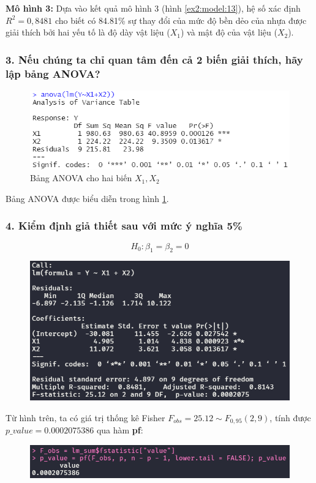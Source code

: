 \documentclass[a4paper]{article}
\theoremstyle{nonumberplain}
\begin{document}
\textbf{Mô hình 3:} Dựa vào kết quả mô hình 3 (hình \ref{ex2:model:13}), hệ số xác định $R^2= 0,8481$ cho biết có 84.81\% sự thay đổi của mức độ bền dẻo của nhựa được giải thích bởi hai yếu tố là độ dày vật liệu ($X_1$) và mật độ của vật liệu ($X_2$).

\subsubsection*{3. Nếu chúng ta chỉ quan tâm đến cả 2 biến giải thích, hãy lập bảng ANOVA?}

\begin{figure}[h!]
	\centering
	\includegraphics[width=0.7\linewidth]{bai2_3.PNG}
	\caption{Bảng ANOVA cho hai biến $X_1,X_2$}
	\label{ex2:model:anova3}
\end{figure}

Bảng ANOVA được biểu diễn trong hình \ref{ex2:model:anova3}.

\subsubsection*{4. Kiểm định giả thiết sau với mức ý nghĩa 5\%}
\[H_0 : \beta_1 = \beta_2= 0\]

\begin{figure}[h!]
	\centering
	\includegraphics[width=0.7\linewidth]{bai-2-4-summary}
	\label{fig:bai-2-4-summary}
\end{figure}

Từ hình trên, ta có giá trị thống kê Fisher $F_{obs} = 25.12 \sim F_{0,95}(2,9)$, tính được $p\_value = 0.0002075386$ qua hàm \textbf{pf}:
\begin{figure}[h!]
	\centering
	\includegraphics[width=0.7\linewidth]{bai-2-4-p_value}
	\label{fig:bai-2-4-pvalue}
\end{figure}
\end{document}
